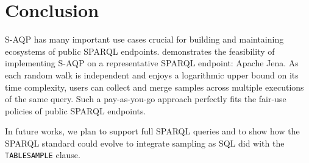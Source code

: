 
\section{Conclusion}

S-AQP has many important use cases crucial for building and
maintaining ecosystems of public SPARQL endpoints.
%
\NAME demonstrates the feasibility of implementing S-AQP on a
representative SPARQL endpoint: Apache Jena.  As each random walk is
independent and enjoys a logarithmic upper bound on its time
complexity, users can collect and merge samples across multiple
executions of the same query. Such a pay-as-you-go approach perfectly
fits the fair-use policies of public SPARQL endpoints.

\noindent In future works, we plan to support full SPARQL queries and
to show how the SPARQL standard could evolve to integrate sampling as
SQL did with the \verb|TABLESAMPLE| clause. 
